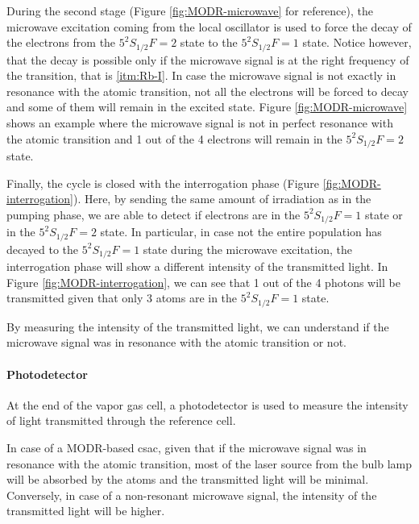 During the second stage (Figure \ref{fig:MODR-microwave} for reference), the microwave excitation coming from the local oscillator is used to force the decay of the electrons from the $5^2S_{1/2} F=2$ state to the $5^2S_{1/2} F=1$ state.
Notice however, that the decay is possible only if the microwave signal is at the right frequency of the transition, that is \ref{itm:Rb-I}.
In case the microwave signal is not exactly in resonance with the atomic transition, not all the electrons will be forced to decay and some of them will remain in the excited state.
Figure \ref{fig:MODR-microwave} shows an example where the microwave signal is not in perfect resonance with the atomic transition and 1 out of the 4 electrons will remain in the $5^2S_{1/2} F=2$ state.

Finally, the cycle is closed with the interrogation phase (Figure \ref{fig:MODR-interrogation}).
Here, by sending the same amount of irradiation as in the pumping phase, we are able to detect if electrons are in the $5^2S_{1/2} F=1$ state or in the $5^2S_{1/2} F=2$ state.
In particular, in case not the entire population has decayed to the $5^2S_{1/2} F=1$ state during the microwave excitation, the interrogation phase will show a different intensity of the transmitted light.
In Figure \ref{fig:MODR-interrogation}, we can see that 1 out of the 4 photons will be transmitted given that only 3 atoms are in the $5^2S_{1/2} F=1$ state.

By measuring the intensity of the transmitted light, we can understand if the microwave signal was in resonance with the atomic transition or not.


\paragraph{Photodetector}

At the end of the vapor gas cell, a photodetector is used to measure the intensity of light transmitted through the reference cell.

In case of a MODR-based \acrshort{csac}, given that if the microwave signal was in resonance with the atomic transition, most of the laser source from the bulb lamp will be absorbed by the atoms and the transmitted light will be minimal.
Conversely, in case of a non-resonant microwave signal, the intensity of the transmitted light will be higher.


